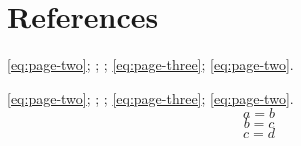 \documentclass{normal}
\begin{document}
\section{References}
\cref{eq:page-two}; ;
; \ref{eq:page-three}; \eqref{eq:page-two}.

\cref*{eq:page-two}; ;
; \ref*{eq:page-three}; \eqref*{eq:page-two}.
\newpage
\begin{equation}\label{eq:unused}a=b\end{equation}
\begin{equation}\label{eq:page-two}b=c\end{equation}
\newpage
\begin{equation}\label{eq:page-three}c=d\end{equation}
\end{document}
